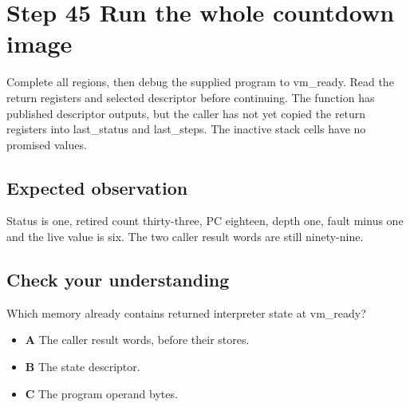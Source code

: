 \section{Step 45 Run the whole countdown image}\label{vm-s45}

Complete all regions, then debug the supplied program to vm\_ready. Read the return registers and selected descriptor before continuing. The function has published descriptor outputs, but the caller has not yet copied the return registers into last\_status and last\_steps. The inactive stack cells have no promised values.

\subsection{Expected observation}
Status is one, retired count thirty-three, PC eighteen, depth one, fault minus one and the live value is six. The two caller result words are still ninety-nine.

\subsection{Check your understanding}
Which memory already contains returned interpreter state at vm\_ready?

\begin{itemize}
  \item \textbf{A} The caller result words, before their stores.
  \item \textbf{B} The state descriptor.
  \item \textbf{C} The program operand bytes.
\end{itemize}
